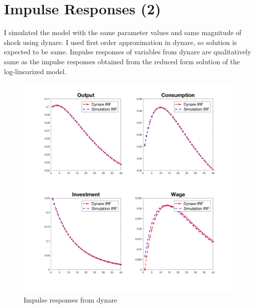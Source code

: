 \documentclass[11pt]{amsart}
\begin{document}
\section{Impulse Responses (2)}
I simulated the model with the same parameter values and same magnitude of shock using dynare. I used first order approximation in dynare, so solution is expected to be same. Impulse responses of variables from dynare are qualitatively same as the impulse responses obtained from the reduced form solution of the log-linearized model. 
\begin{figure}[H]
	\centering
	\includegraphics[width=1\textwidth]{6_Minki.png}
	\caption{Impulse responses from dynare}
\end{figure}
\end{document}
